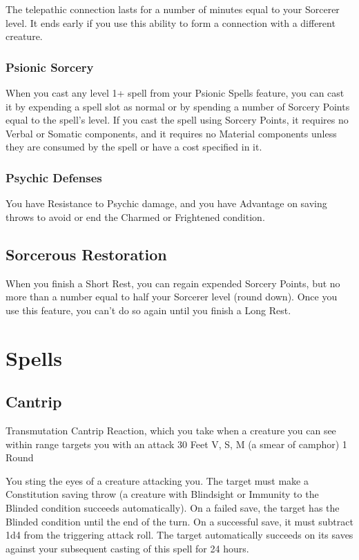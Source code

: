 \documentclass[letterpaper,openany,oneside,twocolumn]{book}
\begin{document}
The telepathic connection lasts for a number of minutes equal to your Sorcerer level. It ends early if you use this ability to form a connection with a different creature.
\subsubsection*{Psionic Sorcery}
When you cast any level 1+ spell from your Psionic Spells feature, you can cast it by expending a spell slot as normal or by spending a number of Sorcery Points equal to the spell's level. If you cast the spell using Sorcery Points, it requires no Verbal or Somatic components, and it requires no Material components unless they are consumed by the spell or have a cost specified in it.
\subsubsection*{Psychic Defenses}
You have Resistance to Psychic damage, and you have Advantage on saving throws to avoid or end the Charmed or Frightened condition.
\subsection*{Sorcerous Restoration}
When you finish a Short Rest, you can regain expended Sorcery Points, but no more than a number equal to half your Sorcerer level (round down). Once you use this feature, you can't do so again until you finish a Long Rest.

\section*{Spells}
\subsection*{Cantrip}
	{Transmutation Cantrip}
	{Reaction, which you take when a creature you can see within range targets you with an attack}
	{30 Feet}
	{V, S, M (a smear of camphor)}
	{1 Round}

You sting the eyes of a creature attacking you. The target must make a Constitution saving throw (a creature with Blindsight or Immunity to the Blinded condition succeeds automatically). On a failed save, the target has the Blinded condition until the end of the turn. On a successful save, it must subtract 1d4 from the triggering attack roll. The target automatically succeeds on its saves against your subsequent casting of this spell for 24 hours.
\end{document}

